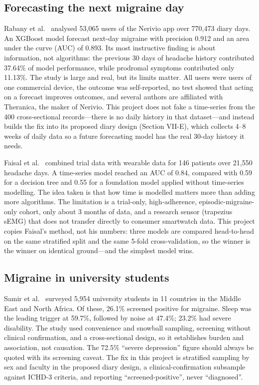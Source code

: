 \documentclass[conference]{IEEEtran}
\begin{document}
\subsection{Forecasting the next migraine day}
Rabany et al.~\cite{rabany2026} analysed 53,065 users of the Nerivio app over 770,473 diary days. An XGBoost model forecast next-day migraine with precision 0.912 and an area under the curve (AUC) of 0.893. Its most instructive finding is about information, not algorithms: the previous 30 days of headache history contributed 37.64\% of model performance, while prodromal symptoms contributed only 11.13\%. The study is large and real, but its limits matter. All users were users of one commercial device, the outcome was self-reported, no test showed that acting on a forecast improves outcomes, and several authors are affiliated with Theranica, the maker of Nerivio. This project does not fake a time-series from the 400 cross-sectional records---there is no daily history in that dataset---and instead builds the fix into its proposed diary design (Section VII-E), which collects 4--8 weeks of daily data so a future forecasting model has the real 30-day history it needs.

Faisal et al.~\cite{faisal2026} combined trial data with wearable data for 146 patients over 21,550 headache days. A time-series model reached an AUC of 0.84, compared with 0.59 for a decision tree and 0.55 for a foundation model applied without time-series modelling. The idea taken is that how time is modelled matters more than adding more algorithms. The limitation is a trial-only, high-adherence, episodic-migraine-only cohort, only about 3 months of data, and a research sensor (trapezius sEMG) that does not transfer directly to consumer smartwatch data. This project copies Faisal's method, not his numbers: three models are compared head-to-head on the same stratified split and the same 5-fold cross-validation, so the winner is the winner on identical ground---and the simplest model wins.

\subsection{Migraine in university students}
Samir et al.~\cite{samir2025} surveyed 5,954 university students in 11 countries in the Middle East and North Africa. Of these, 26.1\% screened positive for migraine. Sleep was the leading trigger at 59.7\%, followed by noise at 47.4\%; 23.2\% had severe disability. The study used convenience and snowball sampling, screening without clinical confirmation, and a cross-sectional design, so it establishes burden and association, not causation. The 72.5\% ``severe depression'' figure should always be quoted with its screening caveat. The fix in this project is stratified sampling by sex and faculty in the proposed diary design, a clinical-confirmation subsample against ICHD-3 criteria, and reporting ``screened-positive'', never ``diagnosed''.
\end{document}
